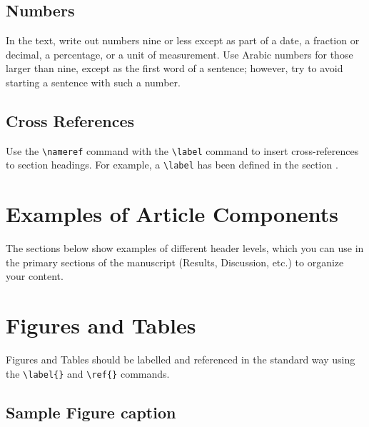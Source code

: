 \documentclass[9pt,twocolumn,twoside,lineno]{gsajnl}
\begin{document}
\subsection{Numbers} In the text, write out numbers nine or less except as part of a date, a fraction or decimal, a percentage, or a unit of measurement. Use Arabic numbers for those larger than nine, except as the first word of a sentence; however, try to avoid starting a sentence with such a number.

\subsection{Cross References}
Use the \verb|\nameref| command with the \verb|\label| command to insert cross-references to section headings. For example, a \verb|\label| has been defined in the section .



\section{Examples of Article Components}
\label{sec:examples}

The sections below show examples of different header levels, which you can use in the primary sections of the manuscript (Results, Discussion, etc.) to organize your content.

\section{Figures and Tables}

Figures and Tables should be labelled and referenced in the standard way using the \verb|\label{}| and \verb|\ref{}| commands.

\subsection{Sample Figure caption}
\end{document}
